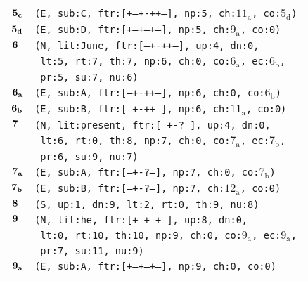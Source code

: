 \documentclass{article}
\begin{document}
\begin{minipage}{\textwidth}
{\begin{tabular}{|r|l|}
    ${\textbf{\textrm{5}}_{\textbf{\textrm{c}}}}$ & \texttt{\texttt{(E,~sub:C,~ftr:[+--+-++--],~np:5,~ch:${\textrm{11}_{\textrm{a}}}$,~co:${\textrm{5}_{\textrm{d}}}$)}} \\
    ${\textbf{\textrm{5}}_{\textbf{\textrm{d}}}}$ & \texttt{\texttt{(E,~sub:D,~ftr:[+--+--+--],~np:5,~ch:${\textrm{9}_{\textrm{a}}}$,~co:0)}} \\
    ${\textbf{\textrm{6}}_{\phantom{z}}}$ & \texttt{\texttt{(N,~lit:June,~ftr:[---+-++--],~up:4,~dn:0,}} \\
    & \texttt{\texttt{~lt:5,~rt:7,~th:7,~np:6,~ch:0,~co:${\textrm{6}_{\textrm{a}}}$,~ec:${\textrm{6}_{\textrm{b}}}$,}} \\
    & \texttt{\texttt{~pr:5,~su:7,~nu:6)}} \\
    ${\textbf{\textrm{6}}_{\textbf{\textrm{a}}}}$ & \texttt{\texttt{(E,~sub:A,~ftr:[---+-++--],~np:6,~ch:0,~co:${\textrm{6}_{\textrm{b}}}$)}} \\
    ${\textbf{\textrm{6}}_{\textbf{\textrm{b}}}}$ & \texttt{\texttt{(E,~sub:B,~ftr:[---+-++--],~np:6,~ch:${\textrm{11}_{\textrm{a}}}$,~co:0)}} \\
    ${\textbf{\textrm{7}}_{\phantom{z}}}$ & \texttt{\texttt{(N,~lit:present,~ftr:[---+-?---],~up:4,~dn:0,}} \\
    & \texttt{\texttt{~lt:6,~rt:0,~th:8,~np:7,~ch:0,~co:${\textrm{7}_{\textrm{a}}}$,~ec:${\textrm{7}_{\textrm{b}}}$,}} \\
    & \texttt{\texttt{~pr:6,~su:9,~nu:7)}} \\
    ${\textbf{\textrm{7}}_{\textbf{\textrm{a}}}}$ & \texttt{\texttt{(E,~sub:A,~ftr:[---+-?---],~np:7,~ch:0,~co:${\textrm{7}_{\textrm{b}}}$)}} \\
    ${\textbf{\textrm{7}}_{\textbf{\textrm{b}}}}$ & \texttt{\texttt{(E,~sub:B,~ftr:[---+-?---],~np:7,~ch:${\textrm{12}_{\textrm{a}}}$,~co:0)}} \\
    ${\textbf{\textrm{8}}_{\phantom{z}}}$ & \texttt{\texttt{(S,~up:1,~dn:9,~lt:2,~rt:0,~th:9,~nu:8)}} \\
    ${\textbf{\textrm{9}}_{\phantom{z}}}$ & \texttt{\texttt{(N,~lit:he,~ftr:[+--+--+--],~up:8,~dn:0,}} \\
    & \texttt{\texttt{~lt:0,~rt:10,~th:10,~np:9,~ch:0,~co:${\textrm{9}_{\textrm{a}}}$,~ec:${\textrm{9}_{\textrm{a}}}$,}} \\
    & \texttt{\texttt{~pr:7,~su:11,~nu:9)}} \\
    ${\textbf{\textrm{9}}_{\textbf{\textrm{a}}}}$ & \texttt{\texttt{(E,~sub:A,~ftr:[+--+--+--],~np:9,~ch:0,~co:0)}} \\

\end{tabular}}
\end{minipage}
\end{document}
